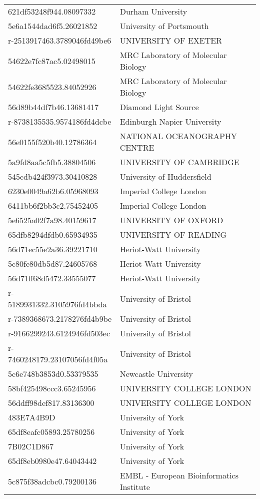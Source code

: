 \begin{tabular}{ll}
621df53248f944.08097332 & Durham University \\
5e6a1544dad6f5.26021852 & University of Portsmouth \\
r-2513917463.3789046fd49be6 & UNIVERSITY OF EXETER \\
54622e7fc87ac5.02498015 & MRC Laboratory of Molecular Biology \\
54622fe3685523.84052926 & MRC Laboratory of Molecular Biology \\
56d89b44df7b46.13681417 & Diamond Light Source \\
r-8738135535.9574186fd4dcbe & Edinburgh Napier University \\
56e0155f520b40.12786364 & NATIONAL OCEANOGRAPHY CENTRE \\
5a9fd8aa5c5fb5.38804506 & UNIVERSITY OF CAMBRIDGE \\
545cdb424f3973.30410828 & University of Huddersfield \\
6230e0049a62b6.05968093 & Imperial College London \\
6411bb6f2bb3c2.75452405 & Imperial College London \\
5e6525a02f7a98.40159617 & UNIVERSITY OF OXFORD \\
65dfb8294dfdb0.65934935 & UNIVERSITY OF READING \\
56d71ec55e2a36.39221710 & Heriot-Watt University \\
5c80fe80db5d87.24605768 & Heriot-Watt University \\
56d71ff68d5472.33555077 & Heriot-Watt University \\
r-5189931332.3105976fd4bbda & University of Bristol \\
r-7389368673.2178276fd4b9be & University of Bristol \\
r-9166299243.6124946fd503ec & University of Bristol \\
r-7460248179.23107056fd4f05a & University of Bristol \\
5c6e748b3853d0.53379535 & Newcastle University \\
58bf425498ccc3.65245956 & UNIVERSITY COLLEGE LONDON \\
56ddff98def817.83136300 & UNIVERSITY COLLEGE LONDON \\
483E7A4B9D & University of York \\
65df8eafc05893.25780256 & University of York \\
7B02C1D867 & University of York \\
65df8eb0980e47.64043442 & University of York \\
5c875f38adcbc0.79200136 & EMBL - European Bioinformatics Institute \\

\end{tabular}
